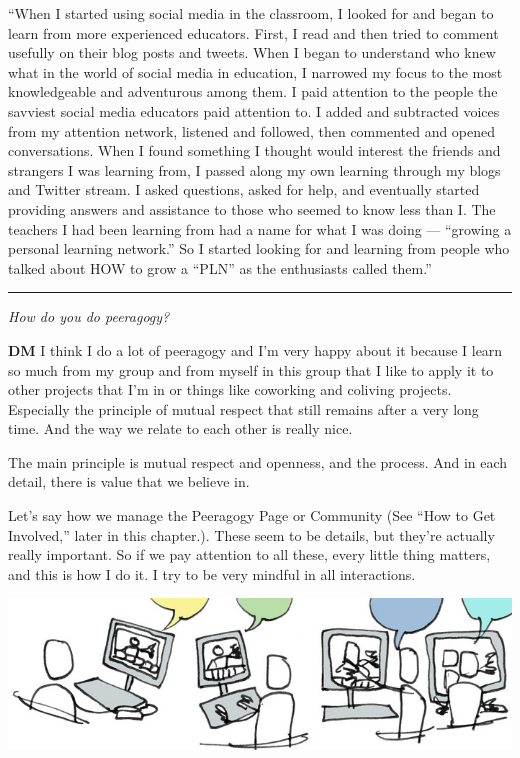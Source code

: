``When I started using social media in the classroom, I looked for and
began to learn from more experienced educators. First, I read and then
tried to comment usefully on their blog posts and tweets. When I began
to understand who knew what in the world of social media in education, I
narrowed my focus to the most knowledgeable and adventurous among them.
I paid attention to the people the savviest social media educators paid
attention to. I added and subtracted voices from my attention network,
listened and followed, then commented and opened conversations. When I
found something I thought would interest the friends and strangers I was
learning from, I passed along my own learning through my blogs and
Twitter stream. I asked questions, asked for help, and eventually
started providing answers and assistance to those who seemed to know
less than I. The teachers I had been learning from had a name for what I
was doing --- ``growing a personal learning network.'' So I started
looking for and learning from people who talked about HOW to grow a
``PLN'' as the enthusiasts called them.''

\begin{center}\rule{0.5\linewidth}{\linethickness}\end{center}

\emph{How do you do peeragogy?}

\textbf{DM} I think I do a lot of peeragogy and I'm very happy about it
because I learn so much from my group and from myself in this group that
I like to apply it to other projects that I'm in or things like
co­working and co­living projects. Especially the principle of mutual
respect that still remains after a very long time. And the way we relate
to each other is really nice.

The main principle is mutual respect and openness, and the process. And
in each detail, there is value that we believe in.

Let's say how we manage the Peeragogy Page or Community (See ``How to
Get Involved,'' later in this chapter.). These seem to be details, but
they're actually really important. So if we pay attention to all these,
every little thing matters, and this is how I do it. I try to be very
mindful in all interactions.

\includegraphics{../pictures/talking.jpg}

